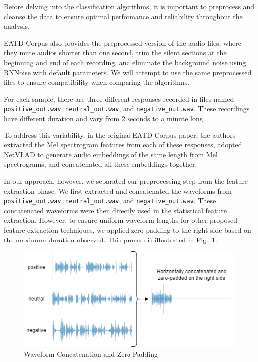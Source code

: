 Before delving into the classification algorithms, it is important to preprocess and cleanse the data to ensure optimal performance and reliability throughout the analysis. 

EATD-Corpus also provides the preprocessed version of the audio files, where they mute audios shorter than one second, trim the silent sections at the beginning and end of each recording, and eliminate the background noise using RNNoise \cite{valin2018hybrid} with default parameters. We will attempt to use the same preprocessed files to ensure compatibility when comparing the algorithms.

For each sample, there are three different responses recorded in files named \texttt{positive\_out.wav}, \texttt{neutral\_out.wav}, and \texttt{negative\_out.wav}. These recordings have different duration and vary from 2 seconds to a minute long.

To address this variability, in the original EATD-Corpus paper, the authors extracted the Mel spectrogram features from each of these responses, adopted NetVLAD \cite{arandjelovic2016netvlad} to generate
audio embeddings of the same length from Mel spectrograms, and concatenated all these embeddings together.

In our approach, however, we separated our preprocessing step from the feature extraction phase. We first extracted and concatenated the waveforms from \texttt{positive\_out.wav}, \texttt{neutral\_out.wav}, and \texttt{negative\_out.wav}. These concatenated waveforms were then directly used in the statistical feature extraction. However, to ensure uniform waveform lengths for other proposed feature extraction techniques, we applied zero-padding to the right side based on the maximum duration observed. This process is illustrated in Fig.~\ref{fig:zeropad}.

\begin{figure}[!t]
    \centerline{\includegraphics[width=\columnwidth]{images/zeropad.png}}
    \caption{Waveform Concatenation and Zero-Padding}
    \label{fig:zeropad}
\end{figure}


